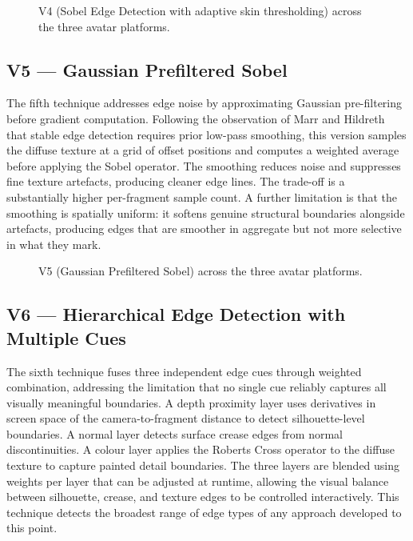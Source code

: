 \begin{figure}[H]
  \centering
  \caption{V4 (Sobel Edge Detection with adaptive skin thresholding) across the three avatar platforms.}
  \label{fig:v4_platforms}
\end{figure}

\subsection{V5 — Gaussian Prefiltered Sobel}
\label{sec:v5}

The fifth technique addresses edge noise by approximating Gaussian pre-filtering before gradient computation. Following the observation of Marr and Hildreth~\cite{marr1980} that stable edge detection requires prior low-pass smoothing, this version samples the diffuse texture at a grid of offset positions and computes a weighted average before applying the Sobel operator. The smoothing reduces noise and suppresses fine texture artefacts, producing cleaner edge lines. The trade-off is a substantially higher per-fragment sample count. A further limitation is that the smoothing is spatially uniform: it softens genuine structural boundaries alongside artefacts, producing edges that are smoother in aggregate but not more selective in what they mark.

\begin{figure}[H]
  \centering
  \caption{V5 (Gaussian Prefiltered Sobel) across the three avatar platforms.}
  \label{fig:v5_platforms}
\end{figure}

\subsection{V6 — Hierarchical Edge Detection with Multiple Cues}
\label{sec:v6}

The sixth technique fuses three independent edge cues through weighted combination, addressing the limitation that no single cue reliably captures all visually meaningful boundaries. A depth proximity layer uses derivatives in screen space of the camera-to-fragment distance to detect silhouette-level boundaries. A normal layer detects surface crease edges from normal discontinuities. A colour layer applies the Roberts Cross operator to the diffuse texture to capture painted detail boundaries. The three layers are blended using weights per layer that can be adjusted at runtime, allowing the visual balance between silhouette, crease, and texture edges to be controlled interactively. This technique detects the broadest range of edge types of any approach developed to this point.

